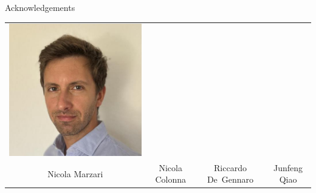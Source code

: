 \documentclass[xcolor=table,aspectratio=169]{beamer}
\numberwithin{equation}{section}
\begin{document}
\begin{frame}{Acknowledgements}
\begin{center}
\begin{tabularx}{\textwidth}{CCCC}
         \includegraphics[height = 0.3\paperheight]{photos/riccardo_degennaro.jpeg} \\
         Nicola Marzari                                                             &
         Nicola Colonna                                                             &
         Riccardo De~Gennaro                                                        &
         Junfeng Qiao
      \end{tabularx}
   \end{center}

   \vspace{2ex}


\end{frame}
\end{document}
